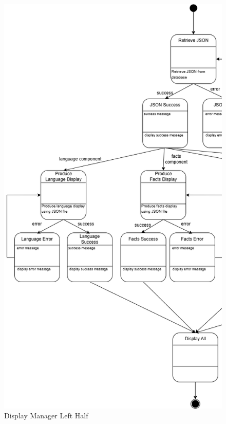 \begin{figure}[H]
	\centering
	\includegraphics[width=\textwidth, height=0.95\textheight, keepaspectratio]{Section2/images/display_manager_state_diagram_left_half.png}
	\caption{Display Manager Left Half}
	\label{DisplayManager}
\end{figure}

